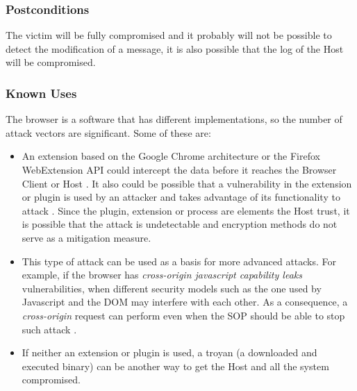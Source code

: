 \documentclass{sig-alternate-05-2015}
\begin{document}
  \subsubsection*{Postconditions} The victim will be fully compromised and it probably will not be possible to detect the modification of a message, it is also possible that the log of the Host will be compromised.
  \subsubsection*{Known Uses} The browser is a software that has different implementations, so the number of attack vectors are significant. Some of these are:
      \begin{itemize}
        \item An extension based on the Google Chrome architecture or the Firefox WebExtension API could intercept the data before it reaches the Browser Client or Host \cite{Paola2006}. It also could be possible that a vulnerability in the extension or plugin is used by an attacker and takes advantage of its functionality to attack \cite{Liu2012,Barth2010}. Since the plugin, extension or process are elements the Host trust, it is possible that the attack is undetectable and encryption methods do not serve as a mitigation measure.
        \item This type of attack can be used as a basis for more advanced attacks. For example, if the browser has \textit{cross-origin javascript capability leaks} vulnerabilities, when different security models such as the one used by Javascript and the DOM may interfere with each other. As a consequence, a \textit{cross-origin} request can perform even when the SOP should be able to stop such attack \cite{Barth2009}.
        \item If neither an extension or plugin is used, a troyan (a downloaded and executed binary) can be another way to get the Host and all the system compromised.
      \end{itemize}
\end{document}
